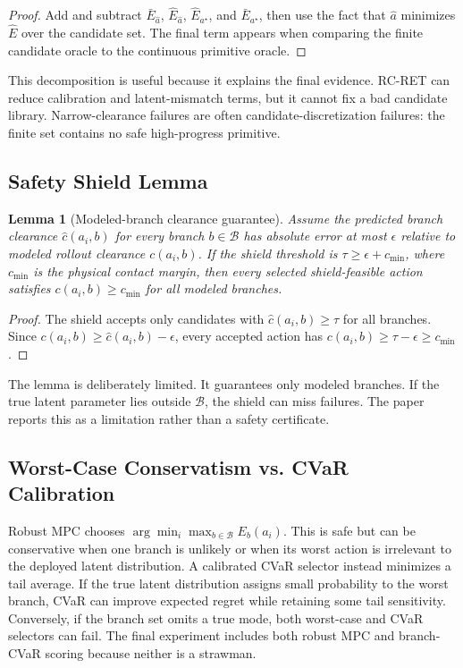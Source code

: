 \documentclass{article}
\newtheorem{lemma}{Lemma}
\newcommand{\method}{RC-RET}
\newcommand{\energy}{E}
\begin{document}
\begin{proof}
Add and subtract $\bar{\energy}_{\hat a}$, $\widehat{\energy}_{\hat a}$, $\widehat{\energy}_{a^\star}$, and $\bar{\energy}_{a^\star}$, then use the fact that $\hat a$ minimizes $\widehat{\energy}$ over the candidate set.  The final term appears when comparing the finite candidate oracle to the continuous primitive oracle.
\end{proof}

This decomposition is useful because it explains the final evidence.  \method{} can reduce calibration and latent-mismatch terms, but it cannot fix a bad candidate library.  Narrow-clearance failures are often candidate-discretization failures: the finite set contains no safe high-progress primitive.

\subsection{Safety Shield Lemma}

\begin{lemma}[Modeled-branch clearance guarantee]
Assume the predicted branch clearance $\hat c(a_i,b)$ for every branch $b \in \mathcal{B}$ has absolute error at most $\epsilon$ relative to modeled rollout clearance $c(a_i,b)$.  If the shield threshold is $\tau \geq \epsilon + c_{\min}$, where $c_{\min}$ is the physical contact margin, then every selected shield-feasible action satisfies $c(a_i,b) \geq c_{\min}$ for all modeled branches.
\end{lemma}

\begin{proof}
The shield accepts only candidates with $\hat c(a_i,b)\geq \tau$ for all branches.  Since $c(a_i,b)\geq \hat c(a_i,b)-\epsilon$, every accepted action has $c(a_i,b)\geq \tau-\epsilon\geq c_{\min}$.
\end{proof}

The lemma is deliberately limited.  It guarantees only modeled branches.  If the true latent parameter lies outside $\mathcal{B}$, the shield can miss failures.  The paper reports this as a limitation rather than a safety certificate.

\subsection{Worst-Case Conservatism vs. CVaR Calibration}

Robust MPC chooses $\arg\min_i \max_{b \in \mathcal{B}}\energy_b(a_i)$.  This is safe but can be conservative when one branch is unlikely or when its worst action is irrelevant to the deployed latent distribution.  A calibrated CVaR selector instead minimizes a tail average.  If the true latent distribution assigns small probability to the worst branch, CVaR can improve expected regret while retaining some tail sensitivity.  Conversely, if the branch set omits a true mode, both worst-case and CVaR selectors can fail.  The final experiment includes both robust MPC and branch-CVaR scoring because neither is a strawman.
\end{document}
